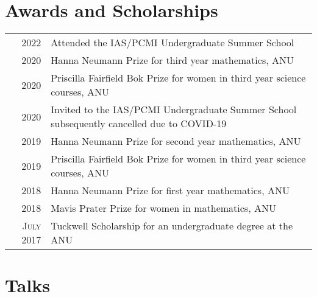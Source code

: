 \documentclass[a4paper,10pt]{article} %
\begin{document}
\section{Awards and Scholarships}

\begin{tabular}{rl}
2022 & Attended the IAS/PCMI Undergraduate Summer School\\

2020 & Hanna Neumann Prize \footnotesize for third year mathematics, ANU \normalsize\\

2020 & Priscilla Fairfield Bok Prize \footnotesize for women in third year science courses, ANU \normalsize\\

2020 & Invited to the IAS/PCMI Undergraduate Summer School \footnotesize subsequently cancelled due to COVID-19\\

2019 & Hanna Neumann Prize \footnotesize for second year mathematics, ANU \normalsize\\

2019 & Priscilla Fairfield Bok Prize \footnotesize for women in third year science courses, ANU \normalsize\\

2018 & Hanna Neumann Prize \footnotesize for first year mathematics, ANU \normalsize\\

2018 & Mavis Prater Prize \footnotesize for women in mathematics, ANU \normalsize\\

\textsc{July} 2017 & Tuckwell Scholarship \footnotesize for an undergraduate degree at the ANU\\

\end{tabular}


\section{Talks}
\end{document}
